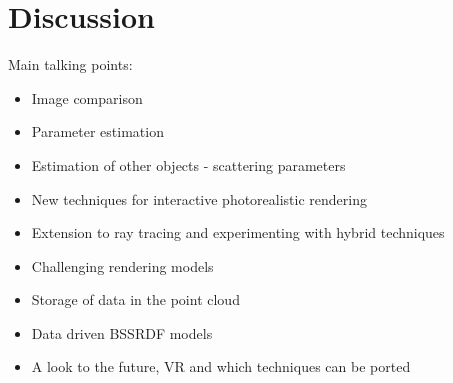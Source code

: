 \section{Discussion}
Main talking points:
\begin{itemize}
\item Image comparison
\item Parameter estimation
\item Estimation of other objects - scattering parameters
\item New techniques for interactive photorealistic rendering
\item Extension to ray tracing and experimenting with hybrid techniques
\item Challenging rendering models
\item Storage of data in the point cloud
\item Data driven BSSRDF models
\item A look to the future, VR and which techniques can be ported
\end{itemize}